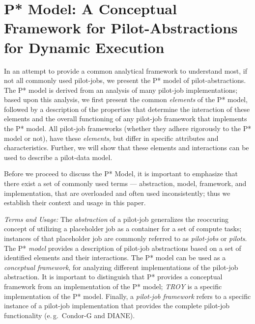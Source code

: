 \documentclass[conference,final]{IEEEtran}
\newcommand{\jhanote}[1]{ {\textcolor{red} { ***shantenu: #1 }}}
\newcommand{\jhanote}[1]{}
\newcommand{\upp}{\vspace*{-0.5em}}
\begin{document}
\section{P* Model: A Conceptual Framework for Pilot-Abstractions for
  Dynamic Execution \upp\upp}
\label{sec:pilot-model}

In an attempt to provide a common analytical framework to understand
most, if not all commonly used pilot-jobs, we present the P* model of
pilot-abstractions. The P* model is derived from an analysis of many
pilot-job implementations; based upon this analysis, we first present
the common {\it elements} of the P* model, followed by a description
of the properties that determine the interaction of these elements and
the overall functioning of any pilot-job framework that implements the
P* model. All pilot-job frameworks (whether they adhere rigorously to
the P* model or not), have these {\it elements}, but differ in
specific attributes and characteristics.  Further, we will show that
these elements and interactions can be used to describe a pilot-data
model.
 
Before we proceed to discuss the P* Model, it is important to
emphasize that there exist a set of commonly used terms ---
abstraction, model, framework, and implementation, that are overloaded
and often used inconsistently; thus we establish their context and
usage in this paper.

\emph{Terms and Usage:} The \emph{ abstraction} of a pilot-job
generalizes the reoccuring concept of utilizing a placeholder job as a
container for a set of compute tasks; instances of that placeholder
job are commonly referred to as \emph{pilot-jobs} or \emph{pilots}.
The P* \emph{model} provides a %
description of pilot-job abstractions based on a set of identified
elements and their interactions. The P* model can be used as a {\it
  conceptual framework}, for analyzing different implementations of
the pilot-job abstraction.  It is important to distinguish that P*
provides a conceptual framework from an implementation of the P*
model; \emph{TROY} is a specific implementation of the P* model.
Finally, a \emph{pilot-job framework} refers to a specific instance of
a pilot-job implementation that provides the complete pilot-job
functionality (e.\,g.\ Condor-G and DIANE).

\end{document}
